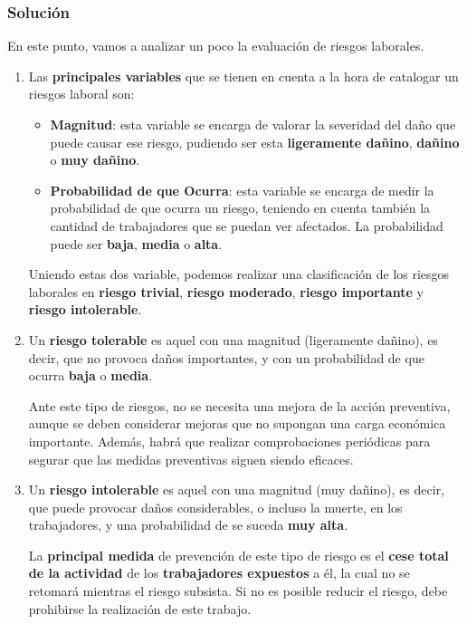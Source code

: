 \subsubsection{Solución}
En este punto, vamos a analizar un poco la evaluación de riesgos laborales.

\begin{enumerate}
    \item Las \textbf{principales variables} que se tienen en cuenta a la hora de catalogar un riesgos laboral son:
    \begin{itemize}
        \item \textbf{Magnitud}: esta variable se encarga de valorar la severidad del daño que puede causar ese riesgo, pudiendo ser esta \textbf{ligeramente dañino}, \textbf{dañino} o \textbf{muy dañino}.

        \item \textbf{Probabilidad de que Ocurra}: esta variable se encarga de medir la probabilidad de que ocurra un riesgo, teniendo en cuenta también la cantidad de trabajadores que se puedan ver afectados. La probabilidad puede ser \textbf{baja}, \textbf{media} o \textbf{alta}.


    \end{itemize}

     Uniendo estas dos variable, podemos realizar una clasificación de los riesgos laborales en \textbf{riesgo trivial}, \textbf{riesgo moderado}, \textbf{riesgo importante} y \textbf{riesgo intolerable}.

    \item Un \textbf{riesgo tolerable} es aquel con una magnitud (ligeramente dañino), es decir, que no provoca daños importantes, y con un probabilidad de que ocurra \textbf{baja} o \textbf{media}.

    Ante este tipo de riesgos, no se necesita una mejora de la acción preventiva, aunque se deben considerar mejoras que  no supongan una carga económica importante. Además, habrá que realizar comprobaciones periódicas para segurar que las medidas preventivas siguen siendo eficaces.

    \item Un \textbf{riesgo intolerable} es aquel con una magnitud (muy dañino), es decir, que puede provocar daños considerables, o incluso la muerte, en los trabajadores, y una probabilidad de se suceda \textbf{muy alta}.

    La \textbf{principal medida} de prevención de este tipo de riesgo es el \textbf{cese total de la actividad} de los \textbf{trabajadores expuestos} a él, la cual no se retomará mientras el riesgo subsista. Si no es posible reducir el riesgo, debe prohibirse la realización de este trabajo.
\end{enumerate}

